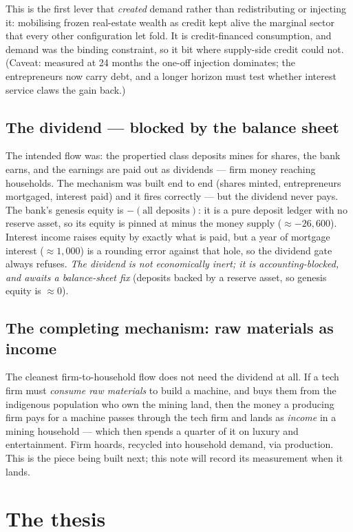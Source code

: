 \documentclass[11pt]{article}
\begin{document}
This is the first lever that \emph{created} demand rather than redistributing or
injecting it: mobilising frozen real-estate wealth as credit kept alive the
marginal sector that every other configuration let fold. It is credit-financed
consumption, and demand was the binding constraint, so it bit where supply-side
credit could not. (Caveat: measured at 24 months the one-off injection dominates;
the entrepreneurs now carry debt, and a longer horizon must test whether interest
service claws the gain back.)

\subsection{The dividend --- blocked by the balance sheet}

The intended flow was: the propertied class deposits mines for shares, the bank
earns, and the earnings are paid out as dividends --- firm money reaching
households. The mechanism was built end to end (shares minted, entrepreneurs
mortgaged, interest paid) and it fires correctly --- but the dividend never pays.
The bank's genesis equity is $-(\text{all deposits})$: it is a pure deposit
ledger with no reserve asset, so its equity is pinned at minus the money supply
($\approx -26{,}600$). Interest income raises equity by exactly what is paid, but
a year of mortgage interest ($\approx 1{,}000$) is a rounding error against that
hole, so the dividend gate always refuses. \emph{The dividend is not economically
inert; it is accounting-blocked, and awaits a balance-sheet fix} (deposits backed
by a reserve asset, so genesis equity is $\approx 0$).

\subsection{The completing mechanism: raw materials as income}

The cleanest firm-to-household flow does not need the dividend at all. If a tech
firm must \emph{consume raw materials} to build a machine, and buys them from the
indigenous population who own the mining land, then the money a producing firm
pays for a machine passes through the tech firm and lands as \emph{income} in a
mining household --- which then spends a quarter of it on luxury and
entertainment. Firm hoards, recycled into household demand, via production. This
is the piece being built next; this note will record its measurement when it
lands.

\section{The thesis}
\end{document}
